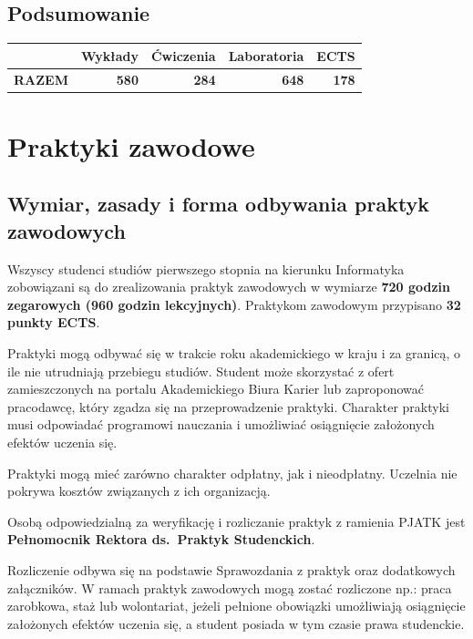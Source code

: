 \documentclass[12pt,a4paper]{article}
\begin{document}
\subsection*{Podsumowanie}

\begin{tabular}{lrrrr}
\toprule
\rowcolor{pjatkRed} {\color{white}} & {\color{white}\textbf{Wykłady}} & {\color{white}\textbf{Ćwiczenia}} & {\color{white}\textbf{Laboratoria}} & {\color{white}\textbf{ECTS}} \\
\midrule
\textbf{RAZEM} & \textbf{580} & \textbf{284} & \textbf{648} & \textbf{178} \\
\bottomrule
\end{tabular}



\newpage

\section{Praktyki zawodowe}

\subsection*{Wymiar, zasady i forma odbywania praktyk zawodowych}

Wszyscy studenci studiów pierwszego stopnia na kierunku Informatyka zobowiązani są do zrealizowania praktyk zawodowych w wymiarze \textbf{720 godzin zegarowych (960 godzin lekcyjnych)}. Praktykom zawodowym przypisano \textbf{32 punkty ECTS}.

Praktyki mogą odbywać się w trakcie roku akademickiego w kraju i za granicą, o ile nie utrudniają przebiegu studiów. Student może skorzystać z ofert zamieszczonych na portalu Akademickiego Biura Karier lub zaproponować pracodawcę, który zgadza się na przeprowadzenie praktyki. Charakter praktyki musi odpowiadać programowi nauczania i umożliwiać osiągnięcie założonych efektów uczenia się.

Praktyki mogą mieć zarówno charakter odpłatny, jak i nieodpłatny. Uczelnia nie pokrywa kosztów związanych z ich organizacją.

Osobą odpowiedzialną za weryfikację i rozliczanie praktyk z ramienia PJATK jest \textbf{Pełnomocnik Rektora ds.~Praktyk Studenckich}.

Rozliczenie odbywa się na podstawie Sprawozdania z praktyk oraz dodatkowych załączników. W ramach praktyk zawodowych mogą zostać rozliczone np.: praca zarobkowa, staż lub wolontariat, jeżeli pełnione obowiązki umożliwiają osiągnięcie założonych efektów uczenia się, a student posiada w tym czasie prawa studenckie.
\end{document}
